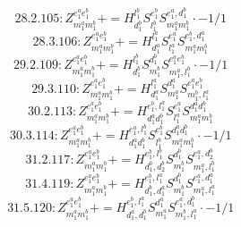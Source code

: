 \documentclass[letterpaper,10pt,fleqn,leqno,onecolumn]{article}
\begin{document}
\begin{equation} \;\;\;\;\;\;  28.2.105: Z^{e_{1}^{a}e_{1}^{b}}_{m_{1}^{a}m_{1}^{b}}+=H^{l_{1}^{b}}_{d_{1}^{b}}S^{e_{1}^{b}}_{l_{1}^{b}}S^{e_{1}^{a},d_{1}^{b}}_{m_{1}^{a}m_{1}^{b}}\cdot -1/1 \end{equation}
\begin{equation} \;\;\;\;\;\;  28.3.106: Z^{e_{1}^{a}e_{1}^{b}}_{m_{1}^{a}m_{1}^{b}}+=H^{l_{1}^{a}}_{d_{1}^{a}}S^{e_{1}^{a}}_{l_{1}^{a}}S^{e_{1}^{b},d_{1}^{a}}_{m_{1}^{a}m_{1}^{b}} \end{equation}
\begin{equation} \;\;\;\;\;\;  29.2.109: Z^{e_{1}^{a}e_{1}^{b}}_{m_{1}^{a}m_{1}^{b}}+=H^{l_{1}^{b}}_{d_{1}^{b}}S^{d_{1}^{b}}_{m_{1}^{b}}S^{e_{1}^{a}e_{1}^{b}}_{m_{1}^{a},l_{1}^{b}}\cdot -1/1 \end{equation}
\begin{equation} \;\;\;\;\;\;  29.3.110: Z^{e_{1}^{a}e_{1}^{b}}_{m_{1}^{a}m_{1}^{b}}+=H^{l_{1}^{a}}_{d_{1}^{a}}S^{d_{1}^{a}}_{m_{1}^{a}}S^{e_{1}^{a}e_{1}^{b}}_{m_{1}^{b},l_{1}^{a}} \end{equation}
\begin{equation} \;\;\;\;\;\;  30.2.113: Z^{e_{1}^{a}e_{1}^{b}}_{m_{1}^{a}m_{1}^{b}}+=H^{e_{1}^{b},l_{1}^{a}}_{d_{1}^{a}d_{1}^{b}}S^{e_{1}^{a}}_{l_{1}^{a}}S^{d_{1}^{a}d_{1}^{b}}_{m_{1}^{a}m_{1}^{b}} \end{equation}
\begin{equation} \;\;\;\;\;\;  30.3.114: Z^{e_{1}^{a}e_{1}^{b}}_{m_{1}^{a}m_{1}^{b}}+=H^{e_{1}^{a},l_{1}^{b}}_{d_{1}^{a}d_{1}^{b}}S^{e_{1}^{b}}_{l_{1}^{b}}S^{d_{1}^{a}d_{1}^{b}}_{m_{1}^{a}m_{1}^{b}}\cdot -1/1 \end{equation}
\begin{equation} \;\;\;\;\;\;  31.2.117: Z^{e_{1}^{a}e_{1}^{b}}_{m_{1}^{a}m_{1}^{b}}+=H^{e_{1}^{b},l_{1}^{b}}_{d_{1}^{b},d_{2}^{b}}S^{d_{1}^{b}}_{m_{1}^{b}}S^{e_{1}^{a},d_{2}^{b}}_{m_{1}^{a},l_{1}^{b}} \end{equation}
\begin{equation} \;\;\;\;\;\;  31.4.119: Z^{e_{1}^{a}e_{1}^{b}}_{m_{1}^{a}m_{1}^{b}}+=H^{e_{1}^{b},l_{1}^{a}}_{d_{1}^{b},d_{1}^{a}}S^{d_{1}^{b}}_{m_{1}^{b}}S^{e_{1}^{a},d_{1}^{a}}_{m_{1}^{a},l_{1}^{a}} \end{equation}
\begin{equation} \;\;\;\;\;\;  31.5.120: Z^{e_{1}^{a}e_{1}^{b}}_{m_{1}^{a}m_{1}^{b}}+=H^{e_{1}^{b},l_{1}^{a}}_{d_{1}^{a},d_{1}^{b}}S^{d_{1}^{a}}_{m_{1}^{a}}S^{e_{1}^{a},d_{1}^{b}}_{m_{1}^{b},l_{1}^{a}}\cdot -1/1 \end{equation}
\end{document}
